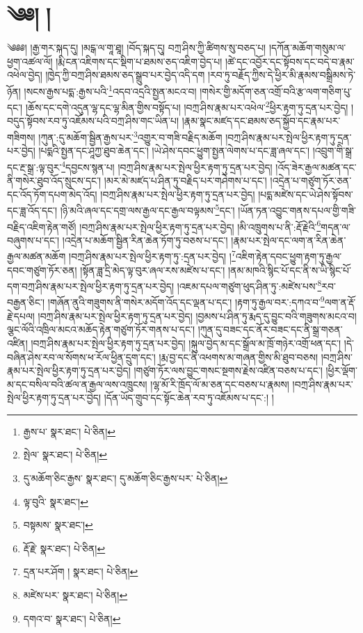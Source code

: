\setcounter{footnote}{0} 
\chapter{༄༅། །}༄༅༅། །རྒྱ་གར་སྐད་དུ། །མངྒ་ལ་གཱ་ཐཱ། །བོད་སྐད་དུ། བཀྲ་ཤིས་ཀྱི་ཚིགས་སུ་བཅད་པ། །དཀོན་མཆོག་གསུམ་ལ་ཕྱག་འཚལ་ལོ། །རྨི་ངན་འཇིགས་དང་སྡིག་པ་ཐམས་ཅད་འཇིག་བྱེད་པ། །ཚེ་དང་འབྱོར་དང་སྟོབས་དང་བདེ་བ་རྣམ་འཕེལ་བྱེད། །ཁྱེད་ཀྱི་བཀྲ་ཤིས་ཐམས་ཅད་སྒྲུབ་པར་བྱེད་འདི་དག །རབ་ཏུ་བརྗོད་ཀྱིས་དེ་ཕྱིར་མི་རྣམས་བསྒྲིམས་ཏེ་ཉོན། །སངས་རྒྱས་པདྨ་:རྒྱས་པའི་\footnote{རྒྱས་པ་  སྣར་ཐང་།  པེ་ཅིན། }འདབ་འདྲའི་སྤྱན་མངའ་བ། །གསེར་གྱི་མདོག་ཅན་འགྲོ་བའི་རྩ་ལག་གཅིག་པུ་དང་། །ཆོས་དང་དགེ་འདུན་ལྷ་དང་ལྷ་མིན་གྱིས་བསྟོད་པ། །བཀྲ་ཤིས་རྣམ་པར་འཕེལ་\footnote{སྤེལ་  སྣར་ཐང་།  པེ་ཅིན། }ཕྱིར་རྟག་ཏུ་དྲན་པར་བྱེད། །བདུད་སྟོབས་རབ་ཏུ་འཇོམས་པའི་བཀྲ་ཤིས་གང་ཡིན་པ། །རྣམ་སྣང་མཛད་དང་ཐམས་ཅད་སྐྱོབ་དང་རྣམ་པར་གཟིགས། །ཀུན་:དུ་མཆོག་སྦྱིན་རྒྱས་པར་\footnote{དུ་མཆོག་ཅིང་རྒྱས་  སྣར་ཐང་། དུ་མཆོག་ཅིང་རྒྱས་པར་  པེ་ཅིན། }འགྱུར་བ་གཟི་བརྗིད་མཆོག །བཀྲ་ཤིས་རྣམ་པར་སྤེལ་ཕྱིར་རྟག་ཏུ་དྲན་པར་བྱེད། །པདྨའི་སྤྱན་དང་ཤཱཀྱ་ཐུབ་ཆེན་དང་། །ཡེ་ཤེས་དབང་ཕྱུག་སྤྱན་ལེགས་པ་དང་ཟླ་ཞལ་དང་། །འབྲུག་གི་སྒྲ་དང་རྔ་སྒྲ་:ལྟ་བུར་\footnote{ལྟ་བུའི་  སྣར་ཐང་། }དབྱངས་སྙན་པ། །བཀྲ་ཤིས་རྣམ་པར་སྤེལ་ཕྱིར་རྟག་ཏུ་དྲན་པར་བྱེད། །འོད་ཟེར་རྒྱལ་མཚན་དང་ནི་གསེར་ཐུབ་འོད་སྲུངས་དང་། །མར་མེ་མཛད་པ་ཤིན་ཏུ་བརྗིད་པར་གཤེགས་པ་དང་། །འདྲེན་པ་གཙུག་ཏོར་ཅན་དང་འོད་ཏོག་དཔག་མེད་འོད། །བཀྲ་ཤིས་རྣམ་པར་སྤེལ་ཕྱིར་རྟག་ཏུ་དྲན་པར་བྱེད། །པདྨ་མཛེས་དང་ཡེ་ཤེས་སྟོབས་དང་ཟླ་འོད་དང་། །ཉི་མའི་ཞལ་དང་དགྲ་ལས་རྒྱལ་དང་རྒྱལ་བལྟམས་\footnote{བསྟམས་  སྣར་ཐང་། }དང་། །ཡོན་ཏན་འབྱུང་གནས་དཔལ་གྱི་གཟི་བརྗིད་འཇིག་རྟེན་གཙོ། །བཀྲ་ཤིས་རྣམ་པར་སྤེལ་ཕྱིར་རྟག་ཏུ་དྲན་པར་བྱེད། །མི་འཁྲུགས་པ་ནི་:རྡོ་རྗེའི་\footnote{རྡོ་རྗེ་  སྣར་ཐང་།  པེ་ཅིན། }གདན་ལ་བཞུགས་པ་དང་། །འདྲེན་པ་མཆོག་སྦྱིན་རིན་ཆེན་ཏོག་ཏུ་བཅས་པ་དང་། །རྣམ་པར་སྤེལ་དང་ལག་ན་རིན་ཆེན་རྒྱལ་མཚན་མཆོག །བཀྲ་ཤིས་རྣམ་པར་སྤེལ་ཕྱིར་རྟག་ཏུ་:དྲན་པར་བྱེད། །\footnote{དྲན་པར་ཤོག །  སྣར་ཐང་།  པེ་ཅིན། }འཇིག་རྟེན་དབང་ཕྱུག་རྟག་ཏུ་རྒྱལ་དབང་གཙུག་ཏོར་ཅན། །སྟོན་ཟླ་དྲི་མེད་ལྟ་བུར་ཞལ་རས་མཛེས་པ་དང་། །ནམ་མཁའི་སྙིང་པོ་དང་ནི་ས་ཡི་སྙིང་པོ་དག་བཀྲ་ཤིས་རྣམ་པར་སྤེལ་ཕྱིར་རྟག་ཏུ་དྲན་པར་བྱེད། །འཇམ་དཔལ་གཙུག་ཕུད་ཤིན་ཏུ་:མཛེས་པས་\footnote{མཛེས་པར་  སྣར་ཐང་།  པེ་ཅིན། }རབ་བརྒྱན་ཅིང་། །གཞོན་ནུའི་གཟུགས་ནི་གསེར་མདོག་འོད་དང་ལྡན་པ་དང་། །རྟག་ཏུ་རྒྱལ་བར་:དཀའ་བ་\footnote{དགའ་བ་  སྣར་ཐང་།  པེ་ཅིན། }ལག་ན་རྡོ་རྗེ་དཔལ། །བཀྲ་ཤིས་རྣམ་པར་སྤེལ་ཕྱིར་རྟག་ཏུ་དྲན་པར་བྱེད། །བྱམས་པ་ཤིན་ཏུ་རྨད་དུ་བྱུང་བའི་གཟུགས་མངའ་བ། ལྕང་ལོའི་འཁྲིལ་མངའ་མཆོད་རྟེན་གཙུག་ཏོར་གནས་པ་དང་། །ཀུན་དུ་བཟང་དང་ནོར་བཟང་དང་ནི་སྒྲ་གཅན་འཛིན། །བཀྲ་ཤིས་རྣམ་པར་སྤེལ་ཕྱིར་རྟག་ཏུ་དྲན་པར་བྱེད། །སྐུལ་བྱེད་མ་དང་སྒྲོལ་མ་ཁྲོ་གཉེར་འགྲོ་ཕན་དང་། །དེ་བཞིན་ཤེས་རབ་ལ་སོགས་ཕ་རོལ་ཕྱིན་དྲུག་དང་། །རྨ་བྱ་དང་ནི་འཕགས་མ་གཞན་གྱིས་མི་ཐུབ་བཅས། །བཀྲ་ཤིས་རྣམ་པར་སྤེལ་ཕྱིར་རྟག་ཏུ་དྲན་པར་བྱེད། །གཙུག་ཏོར་ལས་བྱུང་གསང་སྔགས་རྗེས་འཛིན་བཅས་པ་དང་། །ཕྱིར་ལྡོག་མ་དང་བསིལ་བའི་ཚལ་ན་རྒྱལ་ལས་འཁྲུངས། །ལྷ་མོ་རི་ཁྲོད་ལོ་མ་ཅན་དང་བཅས་པ་རྣམས། །བཀྲ་ཤིས་རྣམ་པར་སྤེལ་ཕྱིར་རྟག་ཏུ་དྲན་པར་བྱེད། །དོན་ཡོད་གྲུབ་དང་སྟོང་ཆེན་རབ་ཏུ་འཇོམས་པ་དང་:། །
